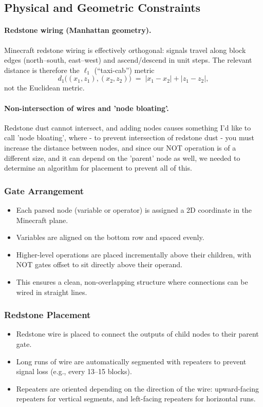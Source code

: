 \documentclass[11pt]{diazessay} %
\begin{document}
\begin{itemize}
\subsection{Physical and Geometric Constraints}

\paragraph{Redstone wiring (Manhattan geometry).}
Minecraft redstone wiring is effectively orthogonal: signals travel along block
edges (north--south, east--west) and ascend/descend in unit steps. The relevant
distance is therefore the $\ell_1$ (``taxi-cab'') metric
\[
d_1\big((x_1,z_1),(x_2,z_2)\big) \;=\; |x_1-x_2| + |z_1-z_2|,
\]
not the Euclidean metric.

\paragraph{Non-intersection of wires and 'node bloating'.}
Redstone dust cannot intersect, and adding nodes causes something I'd like to call 'node bloating', where - to prevent intersection of redstone dust - you must increase the distance between nodes, and since our NOT operation is of a different size, and it can depend on the 'parent' node as well, we needed to determine an algorithm for placement to prevent all of this.



\subsubsection*{Gate Arrangement}
\begin{itemize}
    \item Each parsed node (variable or operator) is assigned a
    2D coordinate in the Minecraft plane.
    \item Variables are aligned on the bottom row and spaced evenly.
    \item Higher-level operations are placed incrementally above their
    children, with NOT gates offset to sit directly above their operand.
    \item This ensures a clean, non-overlapping structure where
    connections can be wired in straight lines.
\end{itemize}

\subsubsection*{Redstone Placement}
\begin{itemize}
    \item Redstone wire is placed to connect the outputs of child nodes
    to their parent gate.
    \item Long runs of wire are automatically segmented with repeaters
    to prevent signal loss (e.g., every 13–15 blocks).
    \item Repeaters are oriented depending on the direction of the wire:
    upward-facing repeaters for vertical segments, and left-facing
    repeaters for horizontal runs.
\end{itemize}


\end{itemize}
\end{document}
